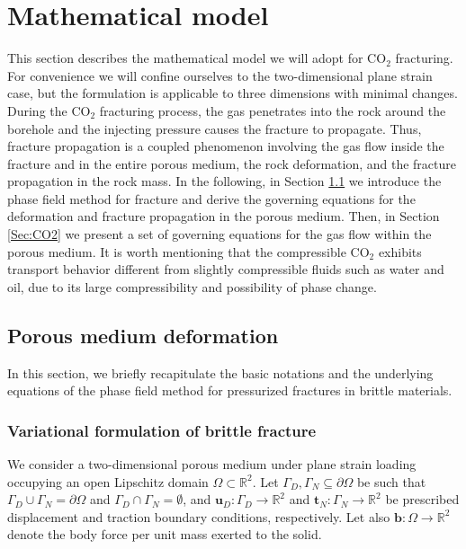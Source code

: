 \section{Mathematical model}\label{sec:Math_model}
{This section describes the mathematical model we will adopt for CO$_2$ fracturing. For convenience we will confine ourselves to the two-dimensional plane strain case, but the formulation is applicable to three dimensions with minimal changes.}
During the CO$_2$ fracturing process, the gas penetrates into the rock around the borehole and the injecting pressure causes the fracture to propagate. Thus, fracture propagation is a coupled phenomenon involving the gas flow inside the fracture and in the entire porous medium, the rock deformation, and the fracture propagation in the rock mass. In the following, in Section \ref{Sec:Phase_Field} we introduce the phase field method for fracture and derive the governing equations for the deformation and fracture propagation in the porous medium. Then, in Section \ref{Sec:CO2} we present a set of governing equations for the gas flow within the porous medium. It is worth mentioning that the compressible CO$_2$ exhibits transport behavior different from slightly compressible fluids such as water and oil, due to its large compressibility and {possibility of} phase change.
\subsection{Porous medium deformation}\label{Sec:Phase_Field}
In this section, 
we briefly recapitulate the basic notations and the underlying equations of the phase field method for pressurized fractures in brittle materials.

\subsubsection{Variational formulation of brittle fracture}
We consider a two-dimensional {porous medium under plane strain loading} occupying an open Lipschitz domain $\Omega\subset\mathbb{R}^2$. 
Let $\Gamma_D,\Gamma_N\subseteq \partial\Omega$ be such that $\Gamma_D\cup\Gamma_N=\partial\Omega$ and $\Gamma_D\cap\Gamma_N=\emptyset$, and $\bm{u}_D: \Gamma_D\rightarrow\mathbb{R}^2$ and $\bm{t}_N: \Gamma_N\rightarrow\mathbb{R}^2$ be prescribed displacement and traction boundary conditions, respectively. Let also $\mathbf{b}:\Omega\rightarrow\mathbb{R}^2$ denote the body force per unit mass exerted to the solid.

